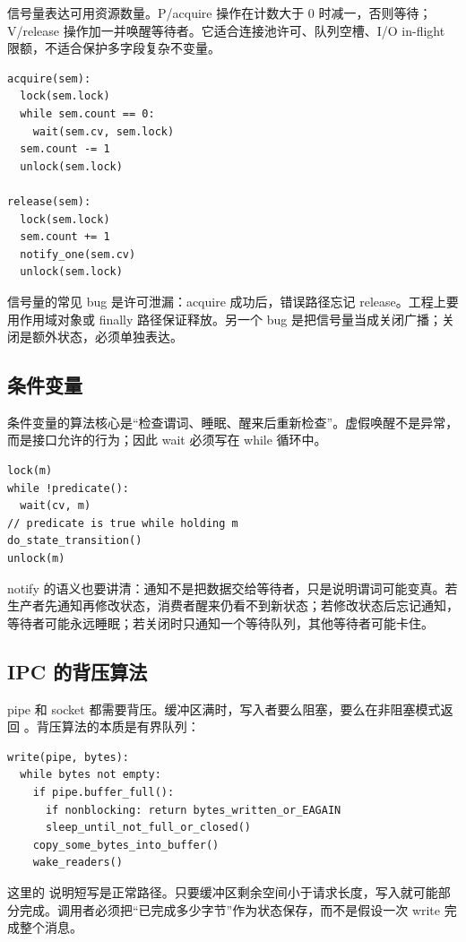 信号量表达可用资源数量。P/acquire 操作在计数大于 0 时减一，否则等待；V/release 操作加一并唤醒等待者。它适合连接池许可、队列空槽、I/O in-flight 限额，不适合保护多字段复杂不变量。

\begin{lstlisting}
acquire(sem):
  lock(sem.lock)
  while sem.count == 0:
    wait(sem.cv, sem.lock)
  sem.count -= 1
  unlock(sem.lock)

release(sem):
  lock(sem.lock)
  sem.count += 1
  notify_one(sem.cv)
  unlock(sem.lock)
\end{lstlisting}

信号量的常见 bug 是许可泄漏：acquire 成功后，错误路径忘记 release。工程上要用作用域对象或 finally 路径保证释放。另一个 bug 是把信号量当成关闭广播；关闭是额外状态，必须单独表达。

\subsection{条件变量}

条件变量的算法核心是“检查谓词、睡眠、醒来后重新检查”。虚假唤醒不是异常，而是接口允许的行为；因此 wait 必须写在 while 循环中。

\begin{lstlisting}
lock(m)
while !predicate():
  wait(cv, m)
// predicate is true while holding m
do_state_transition()
unlock(m)
\end{lstlisting}

notify 的语义也要讲清：通知不是把数据交给等待者，只是说明谓词可能变真。若生产者先通知再修改状态，消费者醒来仍看不到新状态；若修改状态后忘记通知，等待者可能永远睡眠；若关闭时只通知一个等待队列，其他等待者可能卡住。

\subsection{IPC 的背压算法}

pipe 和 socket 都需要背压。缓冲区满时，写入者要么阻塞，要么在非阻塞模式返回 。背压算法的本质是有界队列：

\begin{lstlisting}
write(pipe, bytes):
  while bytes not empty:
    if pipe.buffer_full():
      if nonblocking: return bytes_written_or_EAGAIN
      sleep_until_not_full_or_closed()
    copy_some_bytes_into_buffer()
    wake_readers()
\end{lstlisting}

这里的  说明短写是正常路径。只要缓冲区剩余空间小于请求长度，写入就可能部分完成。调用者必须把“已完成多少字节”作为状态保存，而不是假设一次 write 完成整个消息。

